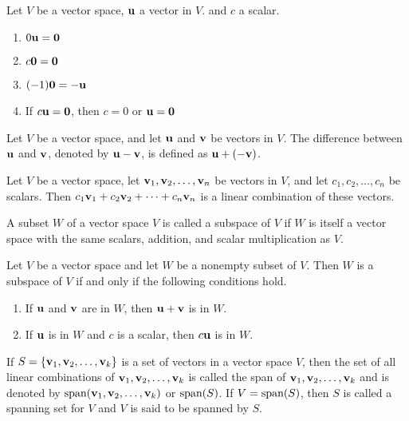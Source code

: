 \documentclass[../m073main.tex]{subfiles}
\begin{document}
\begin{theorem}
	Let $V$ be a vector space, $\mathbf{u}$ a vector in $V$. and $c$ a scalar.
	\begin{enumerate}[label=(\alph*)]
		\item $0 \mathbf{u} = \mathbf{0}$
		\item $c \mathbf{0} = \mathbf{0}$
		\item $(-1) \mathbf{0} = -\mathbf{u}$
		\item If $c \mathbf{u} = \mathbf{0}$, then $c = 0$ or $\mathbf{u} = \mathbf{0}$
	\end{enumerate}
\end{theorem}

\begin{definition}
	Let $V$ be a vector space, and let $\mathbf{u}$ and $\mathbf{v}$ be vectors in $V$.
	The difference between $\mathbf{u}$ and $\mathbf{v}$, denoted by $\mathbf{u} - \mathbf{v}$, is defined as $\mathbf{u} + (-\mathbf{v})$.
\end{definition}

\begin{definition}
	Let $V$ be a vector space, let $\mathbf{v}_1, \mathbf{v}_2, \ldots, \mathbf{v}_n$ be vectors in $V$, and let $c_1, c_2, \ldots, c_n$ be scalars.
	Then $c_1\mathbf{v}_1 + c_2\mathbf{v}_2 + \cdots + c_n \mathbf{v}_n$ is a linear combination of these vectors.
\end{definition}

\begin{definition}[Subspace]
	A subset $W$ of a vector space $V$ is called a subspace of $V$ if $W$ is itself a vector space with the same scalars, addition, and scalar multiplication as $V$.
\end{definition}

\begin{theorem}
	Let $V$ be a vector space and let $W$ be a nonempty subset of $V$.
	Then $W$ is a subspace of $V$ if and only if the following conditions hold.
	\begin{enumerate}[label=(\alph*)]
		\item If $\mathbf{u}$ and $\mathbf{v}$ are in $W$, then $\mathbf{u} + \mathbf{v}$ is in $W$.
		\item If $\mathbf{u}$ is in $W$ and $c$ is a scalar, then $c \mathbf{u}$ is in $W$.
	\end{enumerate}
\end{theorem}

\begin{definition}[Span]
	If $S = \{\mathbf{v}_1, \mathbf{v}_2, \ldots, \mathbf{v}_{k}\}$ is a set of vectors in a vector space $V$, then the set of all linear combinations of $\mathbf{v}_1, \mathbf{v}_2, \ldots, \mathbf{v}_k$ is called the span of $\mathbf{v}_1, \mathbf{v}_2, \ldots, \mathbf{v}_k$ and is denoted by $\textrm{span}(\mathbf{v}_1, \mathbf{v}_2, \ldots, \mathbf{v}_k)$ or $\textrm{span}(S)$.
	If $V = \textrm{span}(S)$, then $S$ is called a spanning set for $V$ and $V$ is said to be spanned by $S$.
\end{definition}
\end{document}
